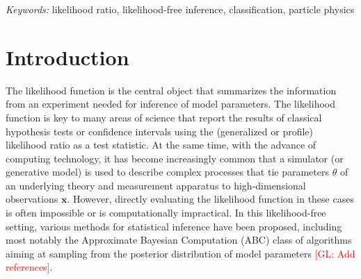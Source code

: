 \documentclass[12pt]{article}
\numberwithin{equation}{section}
\theoremstyle{plain}
\newcommand{\glnote}[1]{\textcolor{red}{[GL: #1]}}
\begin{document}
\noindent%
{\it Keywords:}  likelihood ratio, likelihood-free inference, classification, particle physics
\vfill

\newpage
{} %




\section{Introduction}
\label{sec:introduction}


The likelihood function is the central object that summarizes the information
from an experiment needed for inference of model parameters. The likelihood
function is key to many areas of science that report the results of classical
hypothesis tests or confidence intervals using the (generalized or profile)
likelihood ratio as a test statistic. At the same time, with the advance of
computing technology, it has become increasingly common that a simulator (or
generative model) is used to describe complex processes that tie parameters
$\theta$ of an underlying theory and measurement apparatus to high-dimensional
observations $\mathbf{x}$. However, directly evaluating the likelihood function
in these cases is often impossible or is computationally impractical. In this
likelihood-free setting, various methods for statistical inference have been
proposed, including most notably the Approximate Bayesian Computation (ABC)
class of algorithms aiming at sampling from the posterior distribution of model
parameters \glnote{Add references}.
\end{document}
